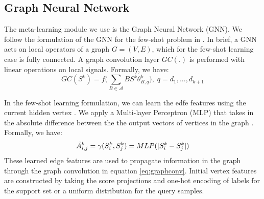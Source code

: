 \documentclass[final]{cvpr}
\begin{document}
\subsection{Graph Neural Network}
The meta-learning module we use is the Graph Neural Network (GNN). We follow the formulation of the GNN for the few-shot problem in \cite{satorras2018few}. In brief, a GNN acts on local operators of a graph \(G = (V,E)\), which for the few-shot learning case is fully connected. A graph convolution layer \(GC(.)\) \cite{satorras2018few} is performed with linear operations on local signals. Formally, we have:
\begin{equation}
    GC(S^{k}) = f \Bigg (\sum_{B\in \mathcal{A}}B S^k \theta^{k}_{B,q} \Bigg ) , \;  q = d_1, ...,d_{k+1}  
    \label{eq:graphconv}
\end{equation}

In the few-shot learning formulation, we can learn the edfe features using the current hidden vertex \cite{satorras2018few}. We apply a Multi-layer Perceptron (MLP) that takes in the absolute difference between the the output vectors of vertices in the graph \cite{kearnes2016molecular} \cite{gilmer2017neural}. Formally, we have:
\begin{equation}
    \Tilde{A}_{i,j}^{k} = \gamma(S_i^k, S_j^k) = MLP(|S_i^k - S_j^k |)
    \label{eq:edge}
\end{equation}
These learned edge features are used to propagate information in the graph through the graph convolution in equation \ref{eq:graphconv}. Initial vertex features are constructed by taking the score projections and one-hot encoding of labels for the support set or a uniform distribution for the query samples.
\end{document}
